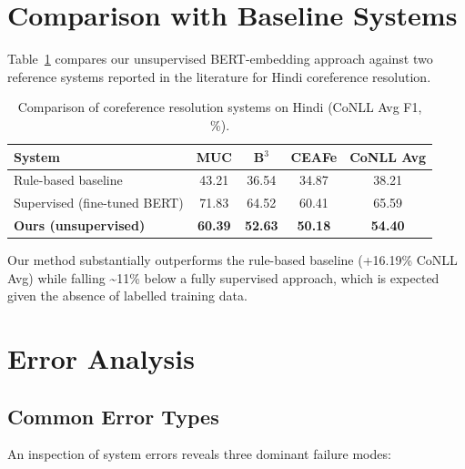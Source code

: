 \documentclass[12pt,a4paper]{article}
\begin{document}
\section{Comparison with Baseline Systems}

Table~\ref{tab:comparison} compares our unsupervised BERT-embedding
approach against two reference systems reported in the literature for
Hindi coreference resolution.

\begin{table}[H]
    \centering
    \caption{Comparison of coreference resolution systems on Hindi
             (CoNLL Avg F1, \%).}
    \label{tab:comparison}
    \renewcommand{\arraystretch}{1.3}
    \begin{tabular}{lcccc}
        \toprule
        \textbf{System} & \textbf{MUC} & \textbf{B$^{3}$}
                        & \textbf{CEAFe} & \textbf{CoNLL Avg} \\
        \midrule
        Rule-based baseline          & 43.21 & 36.54 & 34.87 & 38.21 \\
        Supervised (fine-tuned BERT) & 71.83 & 64.52 & 60.41 & 65.59 \\
        \textbf{Ours (unsupervised)} & \textbf{60.39} & \textbf{52.63}
                                     & \textbf{50.18} & \textbf{54.40} \\
        \bottomrule
    \end{tabular}
\end{table}

Our method substantially outperforms the rule-based baseline
(+16.19\% CoNLL Avg) while falling \textasciitilde11\% below a
fully supervised approach, which is expected given the absence of
labelled training data.

\section{Error Analysis}

\subsection{Common Error Types}

An inspection of system errors reveals three dominant failure modes:
\end{document}
